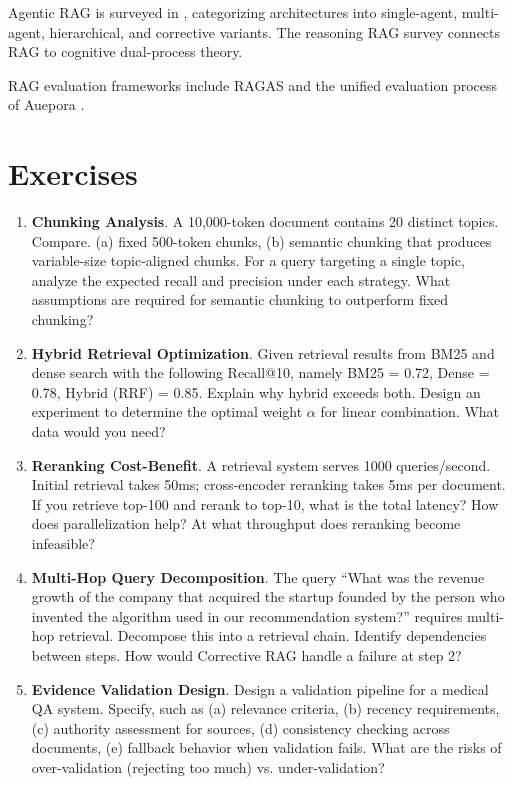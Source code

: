 Agentic RAG is surveyed in \cite{agenticrag2025}, categorizing architectures into single-agent, multi-agent, hierarchical, and corrective variants. The reasoning RAG survey \cite{reasoningrag2025} connects RAG to cognitive dual-process theory.

RAG evaluation frameworks include RAGAS \cite{ragas} and the unified evaluation process of Auepora \cite{auepora}.

\section*{Exercises}

\begin{enumerate}
\item \textbf{Chunking Analysis}. A 10,000-token document contains 20 distinct topics. Compare. (a) fixed 500-token chunks, (b) semantic chunking that produces variable-size topic-aligned chunks. For a query targeting a single topic, analyze the expected recall and precision under each strategy. What assumptions are required for semantic chunking to outperform fixed chunking?

\item \textbf{Hybrid Retrieval Optimization}. Given retrieval results from BM25 and dense search with the following Recall@10, namely BM25 = 0.72, Dense = 0.78, Hybrid (RRF) = 0.85. Explain why hybrid exceeds both. Design an experiment to determine the optimal weight $\alpha$ for linear combination. What data would you need?

\item \textbf{Reranking Cost-Benefit}. A retrieval system serves 1000 queries/second. Initial retrieval takes 50ms; cross-encoder reranking takes 5ms per document. If you retrieve top-100 and rerank to top-10, what is the total latency? How does parallelization help? At what throughput does reranking become infeasible?

\item \textbf{Multi-Hop Query Decomposition}. The query ``What was the revenue growth of the company that acquired the startup founded by the person who invented the algorithm used in our recommendation system?'' requires multi-hop retrieval. Decompose this into a retrieval chain. Identify dependencies between steps. How would Corrective RAG handle a failure at step 2?

\item \textbf{Evidence Validation Design}. Design a validation pipeline for a medical QA system. Specify, such as (a) relevance criteria, (b) recency requirements, (c) authority assessment for sources, (d) consistency checking across documents, (e) fallback behavior when validation fails. What are the risks of over-validation (rejecting too much) vs. under-validation?
\end{enumerate}

